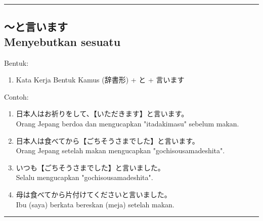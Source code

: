 \vspace{0.2cm}\hrule height 1pt\vspace{0.2cm}


\subsection*{
    ～と言います \\
    Menyebutkan sesuatu
}
Bentuk:
\begin{enumerate}
    \item Kata Kerja Bentuk Kamus (辞書形) + と + 言います
\end{enumerate}
Contoh: 
\begin{enumerate}
    \item 日本人はお祈りをして、【いただきます】と言います。
    \\ Orang Jepang berdoa dan mengucapkan "itadakimasu" sebelum makan.
    \item 日本人は食べてから【ごちそうさまでした】と言います。
    \\ Orang Jepang setelah makan mengucapkan "gochisousamadeshita".
    \item いつも【ごちそうさまでした】と言いました。
    \\ Selalu mengucapkan "gochisousamadeshita".
    \item 母は食べてから片付けてくださいと言いました。
    \\ Ibu (saya) berkata bereskan (meja) setelah makan.
\end{enumerate}

\vspace{0.2cm}\hrule height 1pt\vspace{0.2cm}

\newpage
